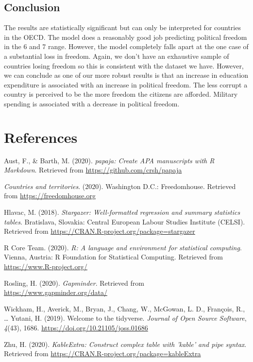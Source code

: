 \documentclass[
  english,
  man,floatsintext]{apa6}
\newlength{\cslhangindent}
\newenvironment{cslreferences}%
  {\setlength{\parindent}{0pt}%
  \everypar{\setlength{\hangindent}{\cslhangindent}}\ignorespaces}%
  {\par}
\begin{document}
\hypertarget{conclusion}{%
\subsection{Conclusion}\label{conclusion}}

The results are statistically significant but can only be interpreted for countries in the OECD. The model does a reasonably good job predicting political freedom in the 6 and 7 range. However, the model completely falls apart at the one case of a substantial loss in freedom. Again, we don't have an exhaustive sample of countries losing freedom so this is consistent with the dataset we have. However, we can conclude as one of our more robust results is that an increase in education expenditure is associated with an increase in political freedom. The less corrupt a country is perceived to be the more freedom the citizens are afforded. Military spending is associated with a decrease in political freedom.

\newpage

\hypertarget{references}{%
\section{References}\label{references}}

\begingroup
\setlength{\parindent}{-0.5in}
\setlength{\leftskip}{0.5in}

\hypertarget{refs}{}
\begin{cslreferences}
\leavevmode\hypertarget{ref-R-papaja}{}%
Aust, F., \& Barth, M. (2020). \emph{papaja: Create APA manuscripts with R Markdown}. Retrieved from \url{https://github.com/crsh/papaja}

\leavevmode\hypertarget{ref-Freedomhouse}{}%
\emph{Countries and territories}. (2020). Washington D.C.: Freedomhouse. Retrieved from \url{https://freedomhouse.org}

\leavevmode\hypertarget{ref-R-stargazer}{}%
Hlavac, M. (2018). \emph{Stargazer: Well-formatted regression and summary statistics tables}. Bratislava, Slovakia: Central European Labour Studies Institute (CELSI). Retrieved from \url{https://CRAN.R-project.org/package=stargazer}

\leavevmode\hypertarget{ref-R-base}{}%
R Core Team. (2020). \emph{R: A language and environment for statistical computing}. Vienna, Austria: R Foundation for Statistical Computing. Retrieved from \url{https://www.R-project.org/}

\leavevmode\hypertarget{ref-Gapminder}{}%
Rosling, H. (2020). \emph{Gapminder}. Retrieved from \url{https://www.gapminder.org/data/}

\leavevmode\hypertarget{ref-R-tidyverse}{}%
Wickham, H., Averick, M., Bryan, J., Chang, W., McGowan, L. D., François, R., \ldots{} Yutani, H. (2019). Welcome to the tidyverse. \emph{Journal of Open Source Software}, \emph{4}(43), 1686. \url{https://doi.org/10.21105/joss.01686}

\leavevmode\hypertarget{ref-R-kableExtra}{}%
Zhu, H. (2020). \emph{KableExtra: Construct complex table with 'kable' and pipe syntax}. Retrieved from \url{https://CRAN.R-project.org/package=kableExtra}
\end{cslreferences}
\end{document}
